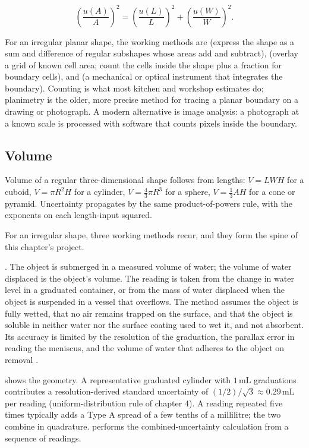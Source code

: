 \[
\left(\frac{u(A)}{A}\right)^{2} = \left(\frac{u(L)}{L}\right)^{2} +
\left(\frac{u(W)}{W}\right)^{2}.
\]

For an irregular planar shape, the working methods are
 (express the shape as a sum and difference of
regular subshapes whose areas add and subtract), 
(overlay a grid of known cell area; count the cells inside the shape
plus a fraction for boundary cells), and  (a
mechanical or optical instrument that integrates the boundary).
Counting is what most kitchen and workshop estimates do; planimetry
is the older, more precise method for tracing a planar boundary on a
drawing or photograph. A modern alternative is image analysis: a
photograph at a known scale is processed with software that counts
pixels inside the boundary.

\subsection{Volume}

Volume of a regular three-dimensional shape follows from lengths:
$V = L W H$ for a cuboid, $V = \pi R^{2} H$ for a cylinder, $V =
\tfrac{4}{3} \pi R^{3}$ for a sphere, $V = \tfrac{1}{3} A H$ for a
cone or pyramid. Uncertainty propagates by the same product-of-powers
rule, with the exponents on each length-input squared.

For an irregular shape, three working methods recur, and they form
the spine of this chapter's project.

. The object is submerged
in a measured volume of water; the volume of water displaced is the
object's volume. The reading is taken from the change in water level
in a graduated container, or from the mass of water displaced when
the object is suspended in a vessel that overflows. The method
assumes the object is fully wetted, that no air remains trapped on
the surface, and that the object is soluble in neither water nor
the surface coating used to wet it, and not absorbent. Its accuracy
is limited by the resolution of the graduation, the parallax error
in reading the meniscus, and the volume of water that adheres to the
object on removal \cite{hist:archimedes-floating}.



 shows the geometry. A
representative graduated cylinder with $1 \,\si{\milli\liter}$
graduations contributes a resolution-derived standard uncertainty of
$(1 / 2) / \sqrt{3} \approx 0.29 \,\si{\milli\liter}$ per reading
(uniform-distribution rule of chapter 4). A reading repeated five
times typically adds a Type A spread of a few tenths of a millilitre;
the two combine in quadrature.
performs the combined-uncertainty calculation from a sequence of
readings.

